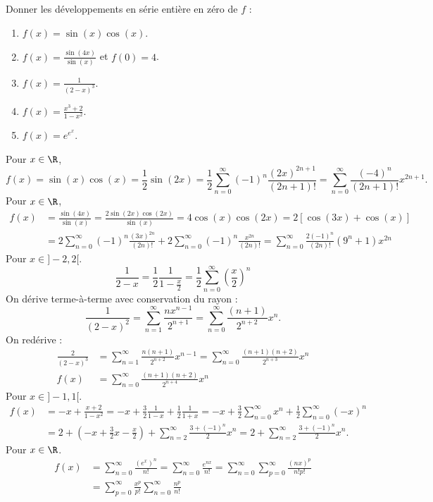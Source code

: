 \documentclass[11pt]{article}
\begin{document}
\begin{ex}{}{}
    Donner les développements en série entière en zéro de $f$ :
    \begin{enumerate}
        \item $f(x)=\sin(x)\cos(x)$.
        \item $f(x)=\frac{\sin(4x)}{\sin(x)}$ et $f(0)=4$.
        \item $f(x)=\frac{1}{(2-x)^3}$.
        \item $f(x)=\frac{x^3+2}{1-x^2}$.
        \item $f(x)=e^{e^x}$.
    \end{enumerate}
    \tcblower
     Pour $x\in\R$,
    \begin{equation*}
        f(x)=\sin(x)\cos(x) = \frac{1}{2}\sin(2x) = \frac{1}{2}\sum_{n=0}^\infty(-1)^n\frac{(2x)^{2n+1}}{(2n+1)!}=\sum_{n=0}^\infty\frac{(-4)^n}{(2n+1)!}x^{2n+1}.
    \end{equation*}
     Pour $x\in\R$,
    \begin{align*}
        f(x)&=\frac{\sin(4x)}{\sin(x)}=\frac{2\sin(2x)\cos(2x)}{\sin(x)}=4\cos(x)\cos(2x)=2\left[ \cos(3x) + \cos(x) \right]\\
        &= 2\sum_{n=0}^\infty(-1)^n\frac{(3x)^{2n}}{(2n)!} + 2\sum_{n=0}^\infty(-1)^n\frac{x^{2n}}{(2n)!} = \sum_{n=0}^\infty\frac{2(-1)^n}{(2n)!}(9^n+1)x^{2n}
    \end{align*}
     Pour $x\in]-2,2[$.
    \begin{equation*}
        \frac{1}{2-x}=\frac{1}{2}\frac{1}{1-\frac{x}{2}} = \frac{1}{2}\sum_{n=0}^\infty\left( \frac{x}{2} \right)^n
    \end{equation*}
    On dérive terme-à-terme avec conservation du rayon :
    \begin{equation*}
        \frac{1}{(2-x)^2}=\sum_{n=1}^\infty\frac{nx^{n-1}}{2^{n+1}}=\sum_{n=0}^\infty\frac{(n+1)}{2^{n+2}}x^n.
    \end{equation*}
    On redérive :
    \begin{align*}
        \frac{2}{(2-x)^3} &= \sum_{n=1}^\infty\frac{n(n+1)}{2^{n+2}}x^{n-1} = \sum_{n=0}^\infty\frac{(n+1)(n+2)}{2^{n+3}}x^n\\
        f(x)&=\sum_{n=0}^\infty\frac{(n+1)(n+2)}{2^{n+4}}x^n
    \end{align*}
     Pour $x\in]-1,1[$.
    \begin{align*}
        f(x) &= -x + \frac{x+2}{1-x^2} = -x + \frac{3}{2}\frac{1}{1-x} + \frac{1}{2}\frac{1}{1+x} = -x + \frac{3}{2}\sum_{n=0}^\infty x^n + \frac{1}{2}\sum_{n=0}^\infty (-x)^n\\
        &= 2 + (-x + \frac{3}{2}x - \frac{x}{2}) + \sum_{n=2}^\infty\frac{3+(-1)^n}{2}x^n = 2 + \sum_{n=2}^\infty \frac{3+(-1)^n}{2}x^n.
    \end{align*}
     Pour $x\in\R$.
    \begin{align*}
        f(x) &= \sum_{n=0}^\infty\frac{(e^x)^n}{n!} = \sum_{n=0}^\infty\frac{e^{nx}}{n!} = \sum_{n=0}^\infty\sum_{p=0}^\infty\frac{(nx)^p}{n!p!}\\
        &=\sum_{p=0}^\infty\frac{x^p}{p!}\sum_{n=0}^\infty\frac{n^p}{n!}
    \end{align*}
\end{ex}
\end{document}
